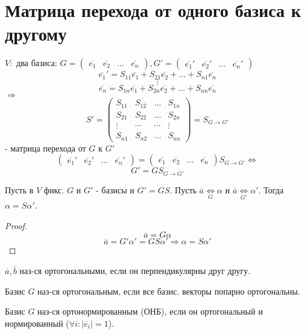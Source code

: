 \section{Матрица перехода от одного базиса к другому}
$V\colon $ два базиса: $G = \begin{pmatrix}\overline{e_1} & \overline{e_2} & \ldots & \overline{e_n} \end{pmatrix}, G' = \begin{pmatrix}\overline{e_1}' & \overline{e_2}' & \ldots & \overline{e_n}' \end{pmatrix}$
\[
    \overline{e_1}' = S_{11} \overline{e_1} + S_{21} \overline{e_2} + \ldots + S_{n1} \overline{e_n}
\] 
\[
\vdots 
\] 
\[
\overline{e_n} = S_{1n} \overline{e_1} + S_{2n} \overline{e_2} + \ldots + S_{nn} \overline{e_n}
\] 
$\Rightarrow$
\[
    S' = \begin{pmatrix}S_{11} & S_{12} & \ldots & S_{1n} \\
    S_{21} & S_{22} & \ldots & S_{2n} \\
\vdots  & \cdots & \cdots  & \vdots \\
S_{n1} & S_{n2} & \ldots & S_{nn}\end{pmatrix} = S_{G \to G'}
\] - матрица перехода от $G$ к $G'$ 
\[
    \begin{pmatrix}\overline{e_1}' & \overline{e_2}' & \ldots & \overline{e_n}' \end{pmatrix} = \begin{pmatrix}\overline{e_1} & \overline{e_2} & \ldots & \overline{e_n} \end{pmatrix} S_{G\to G'} \iff
\] 
\[
G' = GS_{G\to G'}
\] 
\begin{statement}
Пусть в $V$ фикс. $G$ и $G'$ - базисы и $G' = GS$. Пусть $\overline{a} \underset{G}{\Longleftrightarrow} \alpha$ и $\overline{a} \underset{G'}{\Longleftrightarrow} \alpha'$. Тогда $\alpha = S \alpha'$.
\end{statement}
\begin{proof}
\[
\overline{a} = G \alpha
\] 
\[
\overline{a} = G' \alpha' = GS \alpha' \Rightarrow \alpha = S\alpha'
\] 
\end{proof}
\begin{definition}
$\overline{a}, \overline{b}$ наз-ся ортогональными, если он перпендикулярны друг другу.
\end{definition}
\begin{definition}
 Базис $G$ наз-ся ортогональным, если все базис. векторы попарно ортогональны.
\end{definition}
\begin{definition}
Базис $G$ наз-ся ортонормированным (ОНБ), если он ортогональный и нормированный ($\forall i \colon |\overline{e_i}| = 1$).
\end{definition}
